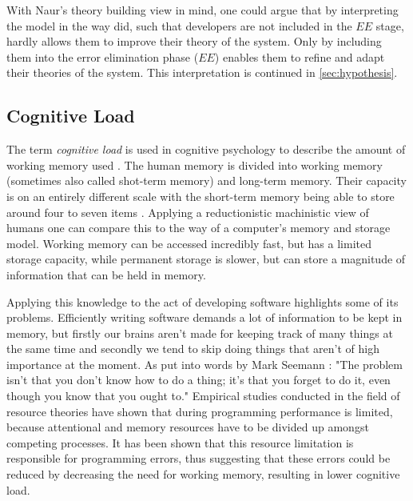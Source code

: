 With Naur's theory building view in mind, one could argue that by interpreting the model in the way \citeauthor{northover_agile_2007} did, such that developers are not included in the $EE$ stage, hardly allows them to improve their theory of the system.
Only by including them into the error elimination phase ($EE$) enables them to refine and adapt their theories of the system.
This interpretation is continued in \ref{sec:hypothesis}.


\subsection{Cognitive Load}
\label{sec:cognitive-load}
The term \emph{cognitive load} is used in cognitive psychology to describe the amount of working memory used \cite{shaw_memory_2016}.
The human memory is divided into working memory (sometimes also called shot-term memory) and long-term memory.
Their capacity is on an entirely different scale \cite{seemann_code_2021} with the short-term memory being able to store around four to seven items \cite{shaw_memory_2016}.
Applying a reductionistic machinistic view of humans one can compare this to the way of a computer's memory and storage model.
Working memory can be accessed incredibly fast, but has a limited storage capacity, while permanent storage is slower, but can store a magnitude of information that can be held in memory.

Applying this knowledge to the act of developing software highlights some of its problems.
Efficiently writing software demands a lot of information to be kept in memory, but firstly our brains aren't made for keeping track of many things at the same time and secondly we tend to skip doing things that aren't of high importance at the moment.
As put into words by Mark Seemann \cite{seemann_code_2021}: "The problem isn't that you don't know how to do a thing; it's that you forget to do it, even though you know that you ought to."
Empirical studies conducted in the field of resource theories \cite{ormerod_human_1990} have shown that during programming performance is limited, because attentional and memory resources have to be divided up amongst competing processes.
It has been shown that this resource limitation is responsible for programming errors, thus suggesting that these errors could be reduced by decreasing the need for working memory, resulting in lower cognitive load.

